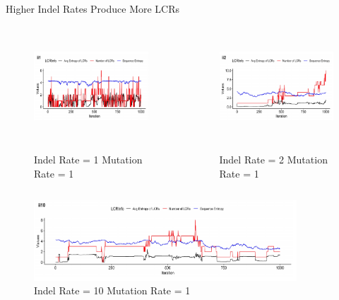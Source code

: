 \documentclass{beamer}
\begin{document}
	\begin{frame}{Higher Indel Rates Produce More LCRs}
		\begin{columns}	
			\centering
			\begin{figure}
				\includegraphics[height=3cm, width=6cm]{ind_figures/ii1} \\~\\
				\vspace{-0.5cm}\tiny\caption{\centering Indel Rate = 1 Mutation Rate = 1}
			\end{figure} \pause
			
			\centering
			\begin{figure}
				\includegraphics[height=3cm, width=6cm]{ind_figures/ii2} \\~\\
				\vspace{-0.5cm}\tiny\caption{\centering Indel Rate = 2 Mutation Rate = 1}
			\end{figure} \pause
			
		\end{columns}
		
		\begin{figure}
			\includegraphics[height=3cm, width=\textwidth]{ind_figures/ii10}
			\vspace{-1cm}\caption{\centering Indel Rate = 10 Mutation Rate = 1}
		\end{figure}
	
	\end{frame}
\end{document}
